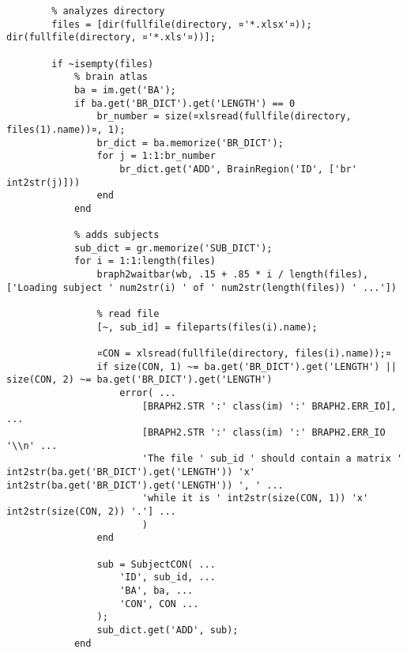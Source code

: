 \documentclass{tufte-handout}
\begin{document}
\begin{lstlisting}
        % analyzes directory
        files = [dir(fullfile(directory, ¤'*.xlsx'¤)); dir(fullfile(directory, ¤'*.xls'¤))];
        
        if ~isempty(files)
            % brain atlas
            ba = im.get('BA');
            if ba.get('BR_DICT').get('LENGTH') == 0
                br_number = size(¤xlsread(fullfile(directory, files(1).name))¤, 1);
                br_dict = ba.memorize('BR_DICT');
                for j = 1:1:br_number
                    br_dict.get('ADD', BrainRegion('ID', ['br' int2str(j)]))
                end
            end

            % adds subjects
            sub_dict = gr.memorize('SUB_DICT');
            for i = 1:1:length(files)
                braph2waitbar(wb, .15 + .85 * i / length(files), ['Loading subject ' num2str(i) ' of ' num2str(length(files)) ' ...'])

                % read file
                [~, sub_id] = fileparts(files(i).name);
                
                ¤CON = xlsread(fullfile(directory, files(i).name));¤
                if size(CON, 1) ~= ba.get('BR_DICT').get('LENGTH') || size(CON, 2) ~= ba.get('BR_DICT').get('LENGTH')
                    error( ...
                        [BRAPH2.STR ':' class(im) ':' BRAPH2.ERR_IO], ...
                        [BRAPH2.STR ':' class(im) ':' BRAPH2.ERR_IO '\\n' ...
                        'The file ' sub_id ' should contain a matrix ' int2str(ba.get('BR_DICT').get('LENGTH')) 'x' int2str(ba.get('BR_DICT').get('LENGTH')) ', ' ...
                        'while it is ' int2str(size(CON, 1)) 'x' int2str(size(CON, 2)) '.'] ...
                        )
                end
                
                sub = SubjectCON( ...
                    'ID', sub_id, ...
                    'BA', ba, ...
                    'CON', CON ...
                );
                sub_dict.get('ADD', sub);
            end
            

\end{lstlisting}
\end{document}
